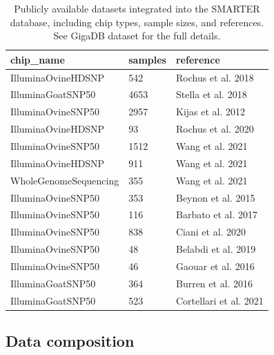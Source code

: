 \documentclass[a4paper,num-refs,gigabyte]{oup-contemporary}
\begin{document}
\begin{table}[b!]
\caption{Publicly available datasets integrated into the SMARTER database, including chip types, sample sizes, and references. See GigaDB dataset\citep{SUPPORTData} for the full details.}
\label{tab:public_datasets}
\begin{center}
\begin{tabular}{l l l}
\toprule
chip\_name & samples & reference \\
\midrule
IlluminaOvineHDSNP & 542 & Rochus et al. 2018 \citep{Rochus2018} \\
IlluminaGoatSNP50 & 4653 & Stella et al. 2018 \citep{Stella2018} \\
IlluminaOvineSNP50 & 2957 & Kijas et al. 2012 \citep{Kijas2012} \\
IlluminaOvineHDSNP & 93 & Rochus et al. 2020 \citep{Rochus2020} \\
IlluminaOvineSNP50 & 1512 & Wang et al. 2021 \citep{Wang2021} \\
IlluminaOvineHDSNP & 911 & Wang et al. 2021 \citep{Wang2021} \\
WholeGenomeSequencing & 355	& Wang et al. 2021 \citep{Wang2021} \\
IlluminaOvineSNP50 & 353 & Beynon et al. 2015 \citep{Beynon2015} \\
IlluminaOvineSNP50 & 116 & Barbato et al. 2017 \citep{Barbato2017} \\
IlluminaOvineSNP50 & 838 & Ciani et al. 2020 \citep{Ciani2020} \\
IlluminaOvineSNP50 & 48 & Belabdi et al. 2019 \citep{Belabdi2019} \\
IlluminaOvineSNP50 & 46 & Gaouar et al. 2016 \citep{Gaouar2016} \\
IlluminaGoatSNP50 & 364 & Burren et al. 2016 \citep{Burren2016} \\
IlluminaGoatSNP50 & 523 & Cortellari et al. 2021 \citep{Cortellari2021} \\
\bottomrule
\end{tabular}
\end{center}
\end{table}

\subsection{Data composition}
\end{document}
